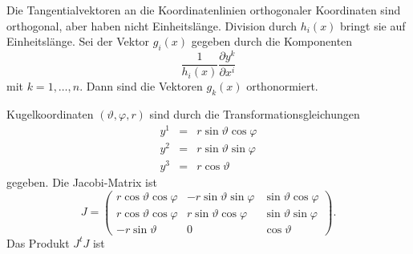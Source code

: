 Die Tangentialvektoren an die Koordinatenlinien orthogonaler Koordinaten
sind orthogonal, aber haben nicht Einheitslänge.
Division durch $h_i(x)$ bringt sie auf Einheitslänge.
Sei der Vektor $g_i(x)$ gegeben durch die Komponenten
\[
\frac{1}{h_i(x)}
\frac{\partial y^k}{\partial x^i}
\]
mit $k=1,\dots,n$.
Dann sind die Vektoren $g_k(x)$ orthonormiert.

\begin{beispiel}
Kugelkoordinaten $(\vartheta,\varphi,r)$ sind durch die
%
Transformationsgleichungen
\begin{equation*}
\begin{array}{rcl}
y^1
&=&
r \sin\vartheta \cos\varphi
\\
y^2
&=&
r \sin\vartheta \sin\varphi
\\
y^3
&=&
r \cos\vartheta 
\end{array}
\end{equation*}
gegeben.
Die Jacobi-Matrix ist
\[
J
=
\begin{pmatrix}
r\cos\vartheta\cos\varphi
&-r\sin\vartheta\sin\varphi
&\sin\vartheta\cos\varphi
\\
r\cos\vartheta\cos\varphi
&r\sin\vartheta\cos\varphi
&\sin\vartheta\sin\varphi
\\
-r\sin\vartheta
&0
&\cos\vartheta
\end{pmatrix}.
\]
Das Produkt $J^tJ$ ist


\end{beispiel}
